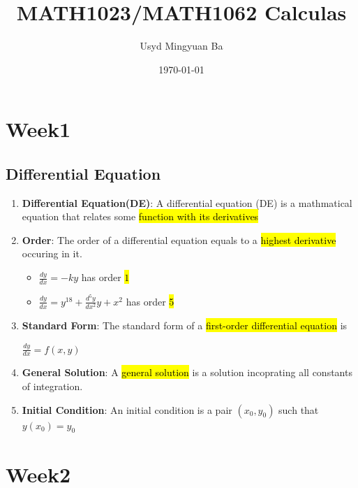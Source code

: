 \documentclass{article}
\title{MATH1023/MATH1062 Calculas}
\author{Usyd Mingyuan Ba}
\date{\today}
\begin{document}
\maketitle

\section{Week1}
  \subsection{Differential Equation}
  \begin{enumerate}

    \item \textbf{Differential Equation(DE)}: A differential equation (DE) is a mathmatical equation that relates some \hl{function with its derivatives}

    \item \textbf{Order}: The order of a differential equation equals to a \hl{highest derivative} occuring in it.
      \begin{itemize}
        \item $\frac{dy}{dx} = -ky$ has order \hl{$1$}
        \item $\frac{dy}{dx} = y^{18} + \frac{d^5y}{dx^2}y + x^2$ has order \hl{5}
      \end{itemize}

    \item \textbf{Standard Form}: The standard form of a \hl{first-order differential equation} is 
      \begin{center}
        $\frac{dy}{dx} = f(x,y)$
      \end{center}

    \item \textbf{General Solution}: A \hl{general solution} is a solution incoprating all constants of integration.

    \item \textbf{Initial Condition}: An initial condition is a pair $(x_0,y_0)$ such that $y(x_0) = y_0$


  \end{enumerate}


\section{Week2}
\end{document}
